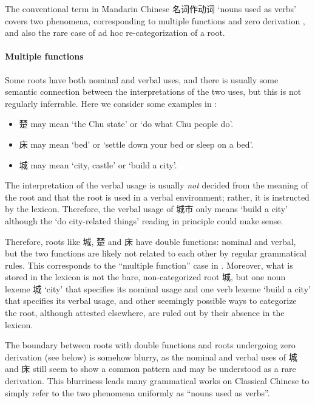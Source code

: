 \documentclass[UTF8, a4paper, oneside, scheme=plain, 12pt]{ctexrep}
\newcommand*{\citesec}[1]{\S~{#1}}
\newcommand{\translate}[1]{`#1'}
\begin{document}
The conventional term in Mandarin Chinese 名词作动词 \translate{nouns used as verbs} covers two phenomena,
corresponding to multiple functions and zero derivation \citep[\citesec{11.3}]{dixon2010basic2},
and also the rare case of ad hoc re-categorization of a root.

\paragraph*{Multiple functions}
Some roots have both nominal and verbal uses,
and there is usually some semantic connection between the interpretations of the two uses,
but this is not regularly inferrable. 
Here we consider some examples in \citet{yang1991dict}:
\begin{itemize}
    \item 楚 may mean \translate{the Chu state} or \translate{do what Chu people do}.
    \item 床 may mean \translate{bed} or \translate{settle down your bed or sleep on a bed}.
    \item 城 may mean \translate{city, castle} or \translate{build a city}.
\end{itemize}
The interpretation of the verbal usage is usually \emph{not} decided
from the meaning of the root and that the root is used in a verbal environment;
rather, it is instructed by the lexicon.
Therefore, the verbal usage of 城市 only means \translate{build a city}
although the \translate{do city-related things} reading in principle could make sense. 

Therefore, roots like 城, 楚 and 床 have double functions: nominal and verbal,
but the two functions are likely not related to each other by regular grammatical rules.
This corresponds to the ``multiple function'' case in \citet[\citesec{11.3}]{dixon2010basic2}.
Moreover, what is stored in the lexicon is not the bare, non-categorized root 城,
but one noun lexeme 城 \translate{city} that specifies its nominal usage 
and one verb lexeme \translate{build a city} that specifies its verbal usage,
and other seemingly possible ways to categorize the root, although attested elsewhere,
are ruled out by their absence in the lexicon.

The boundary between roots with double functions and roots undergoing zero derivation (see below) 
is somehow blurry,
as the nominal and verbal uses of 城 and 床 still seem to show a common pattern
and may be understood as a rare derivation.
This blurriness leads many grammatical works on Classical Chinese 
to simply refer to the two phenomena uniformly as ``nouns used as verbs''.
\end{document}
